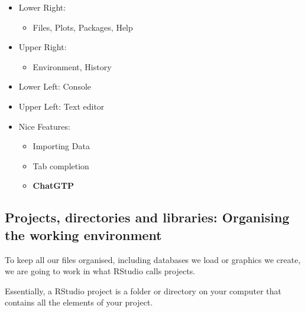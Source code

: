 \documentclass[
  letterpaper,
  DIV=11,
  numbers=noendperiod]{scrartcl}
\providecommand{\tightlist}{%
  \setlength{\itemsep}{0pt}\setlength{\parskip}{0pt}}\usepackage{longtable,booktabs,array}
\begin{document}
\begin{itemize}
\item
  Lower Right:

  \begin{itemize}
  \tightlist
  \item
    Files, Plots, Packages, Help
  \end{itemize}
\item
  Upper Right:

  \begin{itemize}
  \tightlist
  \item
    Environment, History
  \end{itemize}
\item
  Lower Left: Console
\item
  Upper Left: Text editor
\item
  Nice Features:

  \begin{itemize}
  \tightlist
  \item
    Importing Data
  \item
    Tab completion
  \item
    \textbf{ChatGTP}
  \end{itemize}
\end{itemize}

\hypertarget{projects-directories-and-libraries-organising-the-working-environment}{%
\subsection{Projects, directories and libraries: Organising the working
environment}\label{projects-directories-and-libraries-organising-the-working-environment}}

To keep all our files organised, including databases we load or graphics
we create, we are going to work in what RStudio calls projects.

Essentially, a RStudio project is a folder or directory on your computer
that contains all the elements of your project.
\end{document}
